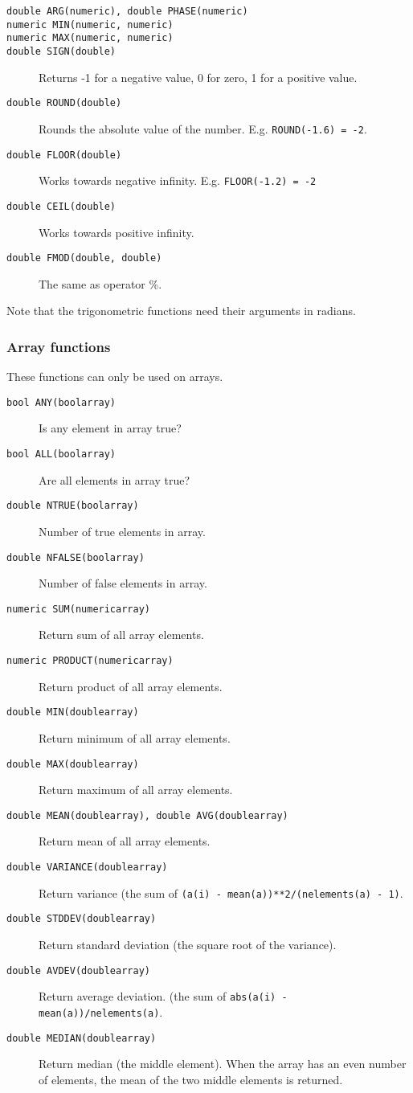 \begin{description}
  \item[ \texttt{double ARG(numeric),  double PHASE(numeric)}]
  \item[ \texttt{numeric MIN(numeric, numeric)}]
  \item[ \texttt{numeric MAX(numeric, numeric)}]
  \item[ \texttt{double SIGN(double)}]
       Returns -1 for a negative value, 0 for zero, 1 for a positive value.
  \item[ \texttt{double ROUND(double)}]
       Rounds the absolute value of the number.
       E.g. \texttt{ROUND(-1.6) = -2}.
  \item[ \texttt{double FLOOR(double)}]
       Works towards negative infinity.
       E.g. \texttt{FLOOR(-1.2) = -2}
  \item[ \texttt{double CEIL(double)}] Works towards positive infinity.
  \item[ \texttt{double FMOD(double, double)}] The same as operator \%.
\end{description}
Note that the trigonometric functions need their arguments in radians.

\subsubsection{Array functions}
These functions can only be used on arrays.
\begin{description}
  \item[ \texttt{bool ANY(boolarray)}] Is any element in array true?
  \item[ \texttt{bool ALL(boolarray)}] Are all elements in array true?
  \item[ \texttt{double NTRUE(boolarray)}] Number of true elements in array.
  \item[ \texttt{double NFALSE(boolarray)}] Number of false elements in array.
  \item[ \texttt{numeric SUM(numericarray)}] Return sum of all array elements.
  \item[ \texttt{numeric PRODUCT(numericarray)}] Return product
    of all array elements.
  \item[ \texttt{double MIN(doublearray)}] Return minimum
    of all array elements.
  \item[ \texttt{double MAX(doublearray)}] Return maximum
    of all array elements.
  \item[ \texttt{double MEAN(doublearray), double AVG(doublearray)}]
    Return mean of all array elements.
  \item[ \texttt{double VARIANCE(doublearray)}] Return variance
    (the sum of \texttt{(a(i) - mean(a))**2/(nelements(a) - 1)}.
  \item[ \texttt{double STDDEV(doublearray)}] Return standard
    deviation (the square root of the variance).
  \item[ \texttt{double AVDEV(doublearray)}] Return average deviation.
    (the sum of \texttt{abs(a(i) - mean(a))/nelements(a)}.
  \item[ \texttt{double MEDIAN(doublearray)}] Return median (the
    middle element).
    When the array has an even number of elements, the mean of
    the two middle elements is returned.
\end{description}

